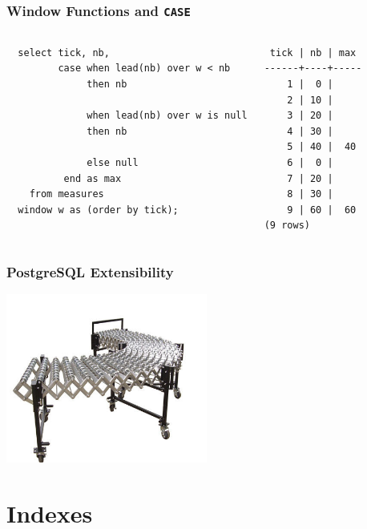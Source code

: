 \documentclass{beamer}
\begin{document}
\begin{frame}[fragile]
  \frametitle{Window Functions and \texttt{CASE}}

\begin{columns}
\begin{verbatim}
  select tick, nb,
         case when lead(nb) over w < nb
              then nb

              when lead(nb) over w is null
              then nb

              else null
          end as max
    from measures
  window w as (order by tick);
\end{verbatim}
\begin{verbatim}
 tick | nb | max 
------+----+-----
    1 |  0 |    
    2 | 10 |    
    3 | 20 |    
    4 | 30 |    
    5 | 40 |  40
    6 |  0 |    
    7 | 20 |    
    8 | 30 |    
    9 | 60 |  60
(9 rows)
\end{verbatim}
\end{columns}
\end{frame}

\begin{frame}[fragile]
  \frametitle{PostgreSQL Extensibility}

  \vfill

\begin{center}
  \includegraphics[height=15em]{extensible.jpg}
\end{center}
\end{frame}

\section{Indexes}
\end{document}

